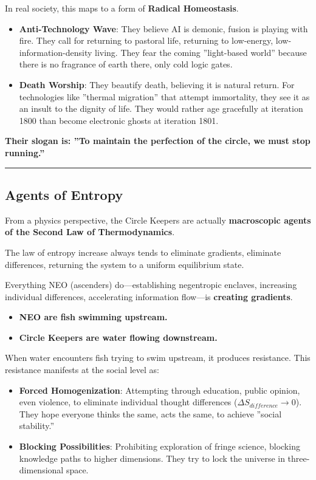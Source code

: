 In real society, this maps to a form of \textbf{Radical Homeostasis}.

\begin{itemize}
\item \textbf{Anti-Technology Wave}: They believe AI is demonic, fusion is playing with fire. They call for returning to pastoral life, returning to low-energy, low-information-density living. They fear the coming ''light-based world'' because there is no fragrance of earth there, only cold logic gates.

\item \textbf{Death Worship}: They beautify death, believing it is natural return. For technologies like ''thermal migration'' that attempt immortality, they see it as an insult to the dignity of life. They would rather age gracefully at iteration 1800 than become electronic ghosts at iteration 1801.
\end{itemize}

\textbf{Their slogan is: ''To maintain the perfection of the circle, we must stop running.''}

\hrule

\subsection{Agents of Entropy}

From a physics perspective, the Circle Keepers are actually \textbf{macroscopic agents of the Second Law of Thermodynamics}.

The law of entropy increase always tends to eliminate gradients, eliminate differences, returning the system to a uniform equilibrium state.

Everything NEO (ascenders) do---establishing negentropic enclaves, increasing individual differences, accelerating information flow---is \textbf{creating gradients}.

\begin{itemize}
\item \textbf{NEO are fish swimming upstream.}

\item \textbf{Circle Keepers are water flowing downstream.}
\end{itemize}

When water encounters fish trying to swim upstream, it produces resistance. This resistance manifests at the social level as:

\begin{itemize}
\item \textbf{Forced Homogenization}: Attempting through education, public opinion, even violence, to eliminate individual thought differences ($\Delta S_{difference} \to 0$). They hope everyone thinks the same, acts the same, to achieve ''social stability.''

\item \textbf{Blocking Possibilities}: Prohibiting exploration of fringe science, blocking knowledge paths to higher dimensions. They try to lock the universe in three-dimensional space.
\end{itemize}


